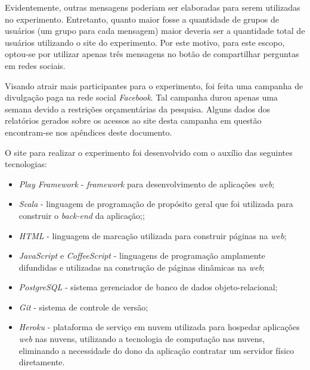Evidentemente, outras mensagens poderiam ser elaboradas para serem utilizadas no experimento. Entretanto, quanto maior fosse a quantidade de grupos de usuários (um grupo para cada mensagem) maior deveria ser a quantidade total de usuários utilizando o site do experimento. Por este motivo, para este escopo, optou-se por utilizar apenas três mensagens no botão de compartilhar perguntas em redes sociais. 

Visando atrair mais participantes para o experimento, foi feita uma campanha de divulgação paga na rede social \textit{Facebook}. Tal campanha durou apenas uma semana devido a restrições orçamentárias da pesquisa. Alguns dados dos relatórios gerados sobre os acessos ao site desta campanha em questão encontram-se nos apêndices deste documento.

O site para realizar o experimento foi desenvolvido com o auxílio das seguintes tecnologias:
    \begin{itemize}
        \item \textit{Play Framework} \cite{hunt2014play} - \textit{framework} para desenvolvimento de aplicações \textit{web};
        \item \textit{Scala} \cite{odersky2008programming} - linguagem de programação de propósito geral que foi utilizada para construir o \textit{back-end} da aplicação;;
        \item \textit{HTML} \cite{pilgrim2010html5} - linguagem de marcação utilizada para construir páginas na \textit{web};
        \item \textit{JavaScript} \cite{flanagan2006javascript} e \textit{CoffeeScript} \cite{maccaw2012little} - linguagens de programação amplamente difundidas e utilizadas na construção de páginas dinâmicas na \textit{web};
        \item \textit{PostgreSQL} \cite{obe2014postgresql} - sistema gerenciador de banco de dados objeto-relacional;
        \item \textit{Git} \cite{loeliger2012version} - sistema de controle de versão;
        \item \textit{Heroku} \cite{middleton2013heroku} - plataforma de serviço em nuvem utilizada para hospedar aplicações \textit{web} nas nuvens, utilizando a tecnologia de computação nas nuvens, eliminando a necessidade do dono da aplicação contratar um servidor físico diretamente.
    \end{itemize}

